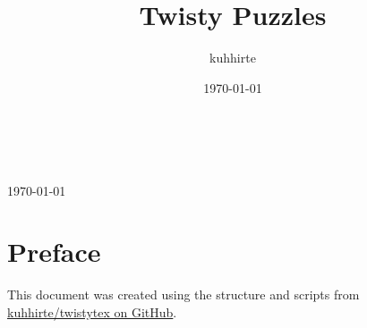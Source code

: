 \documentclass[12pt]{article}
\title{Twisty Puzzles}
\author{kuhhirte}
\date{\today}
\begin{document}
%	
%	
%	
\begin{titlepage}
	
	\thispagestyle{empty}      %
	{\center
		{
			\LARGE\thetitle       %
			\\[5mm]               %
		 	\large\theauthor      %
		 	\\[5mm]               %
		 	\large\today          %
		 	\\[30mm]              %
		}
	}
	
	\tableofcontents
	
	\section*{Preface}
	
	This document was created using the structure and scripts from \href{https://github.com/kuhhirte/twistytex}{kuhhirte/twistytex on GitHub}.
\end{titlepage}



\nocite{*}
\printbibliography[heading=bibintoc]
\end{document}
